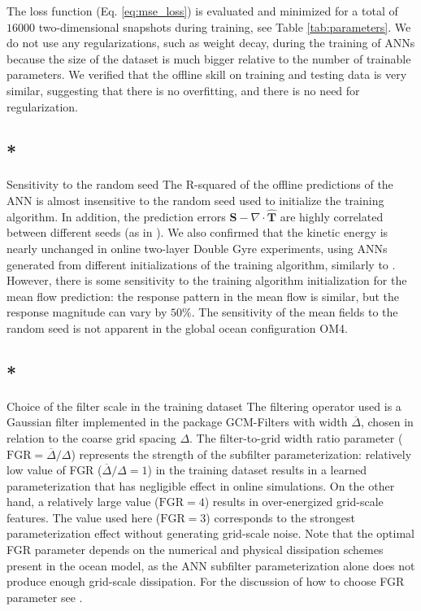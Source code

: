 \documentclass[draft,grl]{agutexSI2019}
\begin{document}
\begin{article}
The loss function (Eq. \eqref{eq:mse_loss}) is evaluated and minimized for a total of $16000$ two-dimensional snapshots during training, see Table \ref{tab:parameters}. We do not use any regularizations, such as weight decay, during the training of ANNs because the size of the dataset is much bigger relative to the number of trainable parameters. We verified that the offline skill on training and testing data is very similar, suggesting that there is no overfitting, and there is no need for regularization.

\subsection{*}{Sensitivity to the random seed}
The R-squared of the offline predictions of the ANN is almost insensitive to the random seed used to initialize the training algorithm. In addition, the prediction errors $\mathbf{S} - \nabla \cdot \widehat{\mathbf{T}}$ are highly correlated between different seeds (as in ). We also confirmed that the kinetic energy is nearly unchanged in online two-layer Double Gyre experiments, using ANNs generated from different initializations of the training algorithm, similarly to . However, there is some sensitivity to the training algorithm initialization for the mean flow prediction: the response pattern in the mean flow is similar, but the response magnitude can vary by $50\%$. The sensitivity of the mean fields to the random seed is not apparent in the global ocean configuration OM4.

\subsection{*}{Choice of the filter scale in the training dataset}
The filtering operator used is a Gaussian filter implemented in the package GCM-Filters \cite{grooms2021diffusion, loose2022gcm} with width $\overline{\Delta}$, chosen in relation to the coarse grid spacing $\Delta$. The filter-to-grid width ratio parameter ($\mathrm{FGR}=\overline{\Delta}/\Delta$) represents the strength of the subfilter parameterization: relatively low value of FGR ($\overline{\Delta}/\Delta=1$) in the training dataset results in a learned parameterization that has negligible effect in online simulations. On the other hand, a relatively large value ($\mathrm{FGR}=4$) results in over-energized grid-scale features. The value used here ($\mathrm{FGR}=3$) corresponds to the strongest parameterization effect without generating grid-scale noise.  Note that the optimal FGR parameter depends on the numerical and physical dissipation schemes present in the ocean model, as the ANN subfilter parameterization alone does not produce enough grid-scale dissipation. For the discussion of how to choose FGR parameter see .





\end{article}
\end{document}
